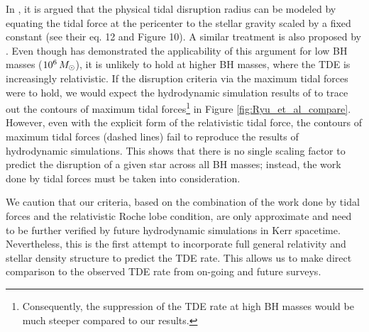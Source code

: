 \documentclass[useAMS,usenatbib]{mn2e}
\def\msun{M_{\rm \odot}}
\begin{document}
In \citet{Ryu2020b}, it is argued that the physical tidal disruption radius can be modeled by equating the tidal force at the pericenter to the stellar gravity scaled by a fixed constant (see their eq. 12 and Figure 10). A similar treatment is also proposed by \citet{Coughlin2022b}. Even though \citep{Ryu2020b} has demonstrated the applicability of this argument for low BH masses ($10^6\,\msun$), it is unlikely to hold at higher BH masses, where the TDE is increasingly relativistic. If the disruption criteria via the maximum tidal forces were to hold, we would expect the hydrodynamic simulation results of \cite{Ryu2020d} to trace out the contours of maximum tidal forces\footnote{Consequently, the suppression of the TDE rate at high BH masses would be much steeper \citep[see Figure 6 of][]{Coughlin2022a} compared to our results.} in Figure \ref{fig:Ryu_et_al_compare}. However, even with the explicit form of the relativistic tidal force, the contours of maximum tidal forces (dashed lines) fail to reproduce the results of hydrodynamic simulations. This shows that there is no single scaling factor to predict the disruption of a given star across all BH masses; instead, the work done by tidal forces must be taken into consideration.

We caution that our criteria, based on the combination of the work done by tidal forces and the relativistic Roche lobe condition, are only approximate and need to be further verified by future hydrodynamic simulations in Kerr spacetime. Nevertheless, this is the first attempt to incorporate full general relativity and stellar density structure to predict the TDE rate. This allows us to make direct comparison to the observed TDE rate from on-going and future surveys.

\end{document}
